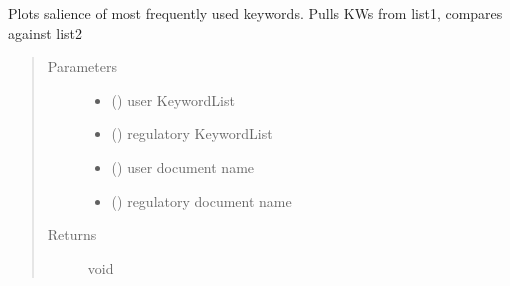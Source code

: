 \documentclass[letterpaper,10pt,english]{sphinxmanual}
\begin{document}
\begin{fulllineitems}
\label{\detokenize{functionsv1:common_functions.plotkeywordsalience}}
Plots salience of most frequently used keywords. Pulls KWs from list1, compares against list2
\begin{quote}\begin{description}
\item[{Parameters}] \leavevmode\begin{itemize}
\item {} 
 ({\hyperref[\detokenize{KeywordList:module-KeywordList}]{}}) \textendash{} user KeywordList

\item {} 
 ({\hyperref[\detokenize{KeywordList:module-KeywordList}]{}}) \textendash{} regulatory KeywordList

\item {} 
 () \textendash{} user document name

\item {} 
 () \textendash{} regulatory document name

\end{itemize}

\item[{Returns}] \leavevmode
void

\end{description}\end{quote}

\end{fulllineitems}

\end{document}
